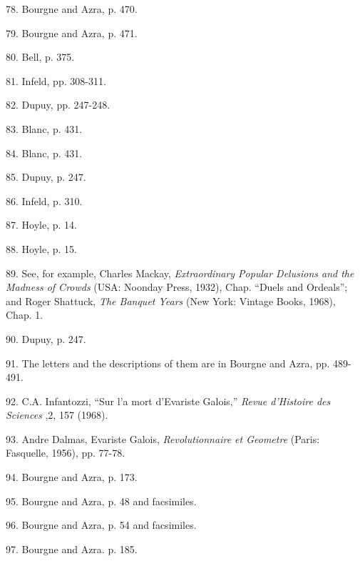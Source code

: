 \documentclass[12pt]{article}
\begin{document}
78. Bourgne and Azra, p. 470. 

79. Bourgne and Azra, p. 471. 

80. Bell, p. 375. 

81. Infeld, pp. 308-311. 

82. Dupuy, pp. 247-248. 

83. Blanc, p. 431. 

84. Blanc, p. 431. 

85. Dupuy, p. 247. 

86. Infeld, p. 310. 

87. Hoyle, p. 14. 

88. Hoyle, p. 15. 

89. See, for example, Charles Mackay, \emph{Extraordinary Popular Delusions and the Madness of Crowds} (USA: Noonday Press, 1932), Chap. ``Duels and Ordeals''; and Roger Shattuck, \emph{The Banquet Years} (New York: Vintage Books, 1968), Chap. 1. 

90. Dupuy, p. 247. 

91. The letters and the descriptions of them are in Bourgne and Azra, pp. 489-491. 

92. C.A. Infantozzi, ``Sur l'a mort d'Evariste Galois,'' {\it Revue d'Histoire des Sciences} ,2, 157 (1968). 

93. Andre Dalmas, Evariste Galois, {\it Revolutionnaire et Geometre} (Paris: Fasquelle, 1956), pp. 77-78. 

94. Bourgne and Azra, p. 173. 

95. Bourgne and Azra, p. 48 and facsimiles. 

96. Bourgne and Azra, p. 54 and facsimiles. 

97. Bourgne and Azra. p. 185.  
\end{document}
